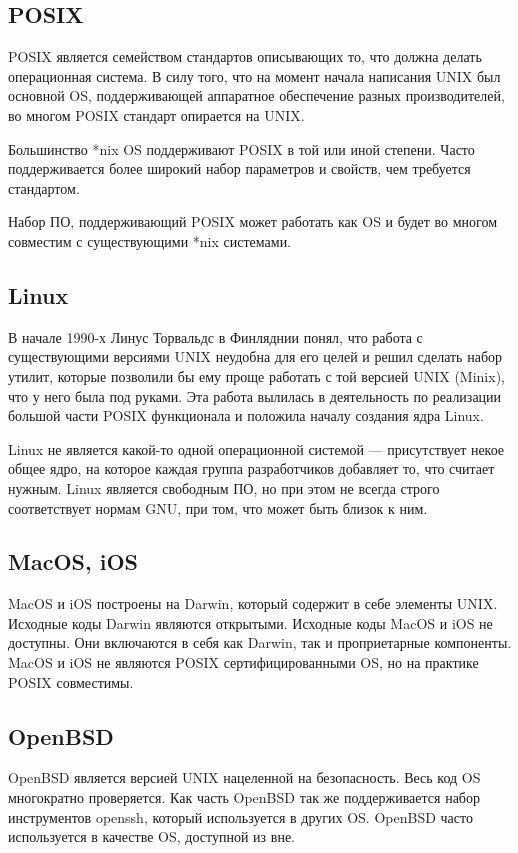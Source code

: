 \subsection{POSIX}
POSIX является семейством стандартов описывающих то, что должна делать операционная система. В силу того, что на момент начала написания UNIX был основной OS, поддерживающей аппаратное обеспечение разных производителей, во многом POSIX стандарт опирается на UNIX.

Большинство *nix OS поддерживают POSIX в той или иной степени. Часто поддерживается более широкий набор параметров и свойств, чем требуется стандартом.

Набор ПО, поддерживающий POSIX может работать как OS и будет во многом совместим с существующими *nix системами.

\subsection{Linux}
В начале 1990-х Линус Торвальдс в Финляднии понял, что работа с существующими версиями UNIX неудобна для его целей и решил сделать набор утилит, которые позволили бы ему проще работать с той версией UNIX (Minix), что у него была под руками. Эта работа вылилась в деятельность по реализации большой части POSIX функционала и положила началу создания ядра Linux.

Linux не является какой-то одной операционной системой --- присутствует некое общее ядро, на которое каждая группа разработчиков добавляет то, что считает нужным. Linux является свободным ПО, но при этом не всегда строго соответствует нормам GNU, при том, что может быть близок к ним.

\subsection{MacOS, iOS}
MacOS и iOS построены на Darwin, который содержит в себе элементы UNIX. Исходные коды Darwin являются открытыми. Исходные коды MacOS и iOS не доступны. Они включаются в себя как Darwin, так и проприетарные компоненты. MacOS и iOS не являются POSIX сертифицированными OS, но на практике POSIX совместимы.

\subsection{OpenBSD}
OpenBSD является версией UNIX нацеленной на безопасность. Весь код OS многократно проверяется. Как часть OpenBSD так же поддерживается набор инструментов openssh, который используется в других OS. OpenBSD часто используется в качестве OS, доступной из вне.

\newpage
